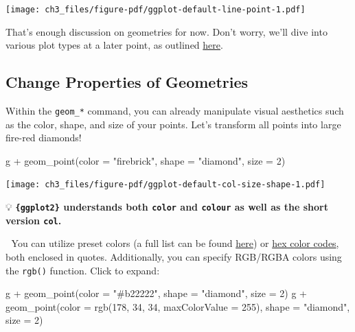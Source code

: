 \documentclass[
  letterpaper,
  DIV=11,
  numbers=noendperiod]{scrreprt}
\newenvironment{Shaded}{\begin{snugshade}}{\end{snugshade}}
\newcommand{\AttributeTok}[1]{\textcolor[rgb]{0.40,0.45,0.13}{#1}}
\newcommand{\DecValTok}[1]{\textcolor[rgb]{0.68,0.00,0.00}{#1}}
\newcommand{\FunctionTok}[1]{\textcolor[rgb]{0.28,0.35,0.67}{#1}}
\newcommand{\NormalTok}[1]{\textcolor[rgb]{0.00,0.23,0.31}{#1}}
\newcommand{\SpecialCharTok}[1]{\textcolor[rgb]{0.37,0.37,0.37}{#1}}
\newcommand{\StringTok}[1]{\textcolor[rgb]{0.13,0.47,0.30}{#1}}
\begin{document}
\texttt{[image: ch3\_files/figure-pdf/ggplot-default-line-point-1.pdf]}

That's enough discussion on geometries for now. Don't worry, we'll dive
into various plot types at a later point, as outlined
\hyperref[charts]{here}.

\subsection{Change Properties of
Geometries}\label{change-properties-of-geometries}

Within the \texttt{geom\_*} command, you can already manipulate visual
aesthetics such as the color, shape, and size of your points. Let's
transform all points into large fire-red diamonds!

\begin{Shaded}
\begin{Highlighting}[]
\NormalTok{g }\SpecialCharTok{+} \FunctionTok{geom\_point}\NormalTok{(}\AttributeTok{color =} \StringTok{"firebrick"}\NormalTok{, }\AttributeTok{shape =} \StringTok{"diamond"}\NormalTok{, }\AttributeTok{size =} \DecValTok{2}\NormalTok{)}
\end{Highlighting}
\end{Shaded}

\texttt{[image: ch3\_files/figure-pdf/ggplot-default-col-size-shape-1.pdf]}

💡 \textbf{\texttt{\{ggplot2\}} understands both \texttt{color} and
\texttt{colour} as well as the short version \texttt{col}.}

💁 You can utilize preset colors (a full list can be found
\href{http://www.stat.columbia.edu/~tzheng/files/Rcolor.pdf}{here}) or
\href{https://www.techopedia.com/definition/29788/color-hex-code}{hex
color codes}, both enclosed in quotes. Additionally, you can specify
RGB/RGBA colors using the \texttt{rgb()} function. Click to expand:

\begin{Shaded}
\begin{Highlighting}[]
\NormalTok{g }\SpecialCharTok{+} \FunctionTok{geom\_point}\NormalTok{(}\AttributeTok{color =} \StringTok{"\#b22222"}\NormalTok{, }\AttributeTok{shape =} \StringTok{"diamond"}\NormalTok{, }\AttributeTok{size =} \DecValTok{2}\NormalTok{)}
\NormalTok{g }\SpecialCharTok{+} \FunctionTok{geom\_point}\NormalTok{(}\AttributeTok{color =} \FunctionTok{rgb}\NormalTok{(}\DecValTok{178}\NormalTok{, }\DecValTok{34}\NormalTok{, }\DecValTok{34}\NormalTok{, }\AttributeTok{maxColorValue =} \DecValTok{255}\NormalTok{), }\AttributeTok{shape =} \StringTok{"diamond"}\NormalTok{, }\AttributeTok{size =} \DecValTok{2}\NormalTok{)}
\end{Highlighting}
\end{Shaded}
\end{document}
